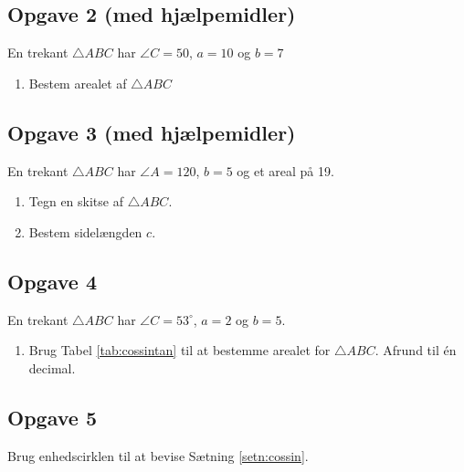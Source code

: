 \subsection*{Opgave 2 (med hjælpemidler)}

En trekant $\triangle ABC$ har $\angle C = 50$, $a = 10$ og $b = 7$
\begin{enumerate}[label=\roman*)]
	\item Bestem arealet af $\triangle ABC$
\end{enumerate}

\subsection*{Opgave 3 (med hjælpemidler)}
En trekant $\triangle ABC$ har $\angle A = 120$, $b = 5$ og et areal på 19.
\begin{enumerate}[label=\roman*)]
	\item Tegn en skitse af $\triangle ABC$.
	\item Bestem sidelængden $c$. 
\end{enumerate}

\subsection*{Opgave 4}

En trekant $\triangle ABC$ har $\angle C = 53^\circ$, $a = 2$ og $b = 5$.
\begin{enumerate}[label=\roman*)]
	\item Brug Tabel \ref{tab:cossintan} til at bestemme arealet for $\triangle ABC$. Afrund til én decimal. 
\end{enumerate} 


\subsection*{Opgave 5} 
	Brug enhedscirklen til at bevise Sætning \ref{setn:cossin}.

